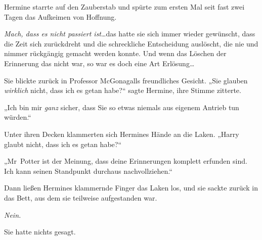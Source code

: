 Hermine starrte auf den Zauberstab und spürte zum ersten Mal seit fast zwei Tagen das Aufkeimen von Hoffnung.

\emph{Mach, dass es nicht passiert ist}…das hatte sie sich immer wieder gewünscht, dass die Zeit sich zurückdreht und die schreckliche Entscheidung auslöscht, die nie und nimmer rückgängig gemacht werden konnte. Und wenn das Löschen der Erinnerung das nicht war, so war es doch eine Art Erlösung…


Sie blickte zurück in Professor McGonagalls freundliches Gesicht. „Sie glauben \emph{wirklich} nicht, dass ich es getan habe?“ sagte Hermine, ihre Stimme zitterte.

„Ich bin mir \emph{ganz} sicher, dass Sie so etwas niemals aus eigenem Antrieb tun würden.“

Unter ihren Decken klammerten sich Hermines Hände an die Laken.
„Harry glaubt nicht, dass ich es getan habe?“

„Mr~Potter ist der Meinung, dass deine Erinnerungen komplett erfunden sind. Ich kann seinen Standpunkt durchaus nachvollziehen.“

Dann ließen Hermines klammernde Finger das Laken los, und sie sackte zurück in das Bett, aus dem sie teilweise aufgestanden war.

\emph{Nein.}

Sie hatte nichts gesagt.

